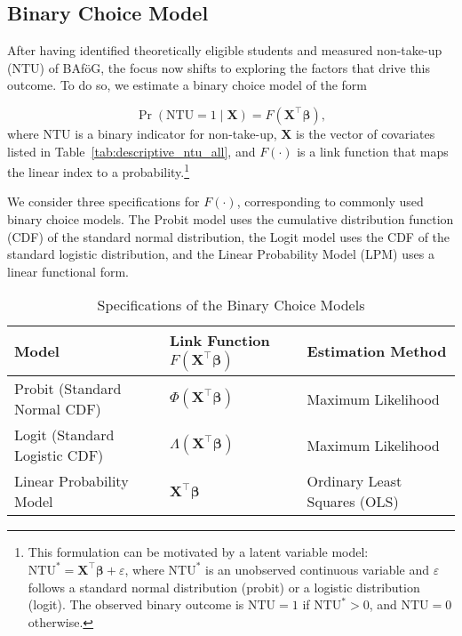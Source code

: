 %
%
\subsection{Binary Choice Model}

After having identified theoretically eligible students and measured non-take-up (NTU) of BAföG, the focus now shifts to exploring the factors that drive this outcome. To do so, we estimate a binary choice model of the form

\begin{equation}
  \Pr(\mathrm{NTU} = 1 \mid \mathbf{X}) = F(\mathbf{X}^\top \boldsymbol{\beta}),
\end{equation}
where \( \mathrm{NTU} \) is a binary indicator for non-take-up, \( \mathbf{X} \) is the vector of covariates listed in Table~\ref{tab:descriptive_ntu_all}, and \( F(\cdot) \) is a link function that maps the linear index to a probability.\footnote{
This formulation can be motivated by a latent variable model: \( \mathrm{NTU}^* = \mathbf{X}^\top \boldsymbol{\beta} + \varepsilon \), where \( \mathrm{NTU}^* \) is an unobserved continuous variable and \( \varepsilon \) follows a standard normal distribution (probit) or a logistic distribution (logit). The observed binary outcome is \( \mathrm{NTU} = 1 \) if \( \mathrm{NTU}^* > 0 \), and \( \mathrm{NTU} = 0 \) otherwise.
}

We consider three specifications for \( F(\cdot) \), corresponding to commonly used binary choice models. 
The Probit model uses the cumulative distribution function (CDF) of the standard normal distribution, the Logit model uses the CDF of the standard logistic distribution, and the Linear Probability Model (LPM) uses a linear functional form.

\begin{table}[H]
\footnotesize
\centering
\label{tab:model_specifications}
\begin{tabular}{@{}lll@{}}
\toprule
\textbf{Model} & \textbf{Link Function \( F(\mathbf{X}^\top \boldsymbol{\beta}) \)} & \textbf{Estimation Method} \\ \midrule
Probit (Standard Normal CDF) & \( \Phi(\mathbf{X}^\top \boldsymbol{\beta}) \) & Maximum Likelihood \\
Logit (Standard Logistic CDF) & \( \Lambda(\mathbf{X}^\top \boldsymbol{\beta}) \) & Maximum Likelihood \\
Linear Probability Model & \( \mathbf{X}^\top \boldsymbol{\beta} \) & Ordinary Least Squares (OLS) \\
\bottomrule
\end{tabular}
\caption{Specifications of the Binary Choice Models}
\end{table}

